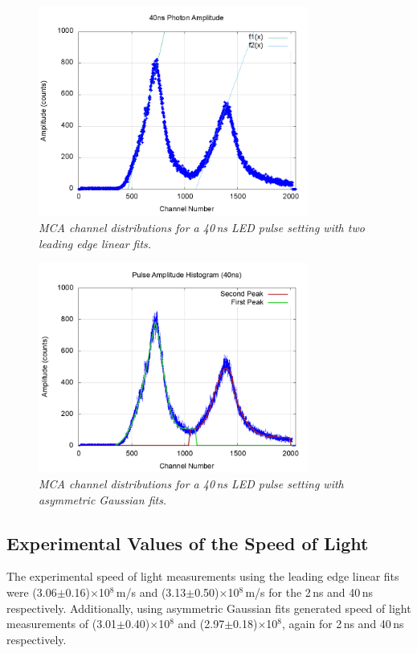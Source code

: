 \documentclass[aps,prl,twocolumn,superscriptaddress,nofootinbib]{revtex4-1}
\begin{document}
\begin{figure}[h!]
  \begin{center}
\centerline{\includegraphics[width=3.5in]{solgraph40.png}}
\caption{\it \small{MCA channel distributions for a 40\,ns LED pulse setting with two leading edge linear fits. \label{fig1}}}
  \end{center}
\end{figure}

\begin{figure}[h!]
  \begin{center}
\centerline{\includegraphics[width=3.5in]{40nsgauss.png}}
\caption{\it \small{MCA channel distributions for a 40\,ns LED pulse setting with asymmetric Gaussian fits. \label{fig1}}}
  \end{center}
\end{figure}

\vfill\eject

\subsection{Experimental Values of the Speed of Light}

The experimental speed of light measurements using the leading edge linear fits were (3.06$\pm$0.16)$\times$10$^8$\,m/s and (3.13$\pm$0.50)$\times$10$^8$\,m/s for the 2\,ns and 40\,ns respectively. Additionally, using asymmetric Gaussian fits generated speed of light measurements of (3.01$\pm$0.40)$\times$10$^8$ and (2.97$\pm$0.18)$\times$10$^8$, again for 2\,ns and 40\,ns respectively. 
\end{document}
